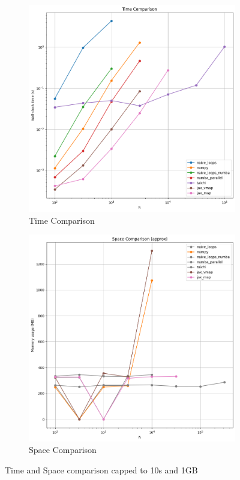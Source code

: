 \documentclass[a4paper, 11pt]{article}         %
\begin{document}
\begin{figure}
\centering
\begin{subfigure}{.5\textwidth}
  \centering
  \includegraphics[width=\linewidth]{images/time_comp2}
  \caption{Time Comparison}
  \label{fig:time}
\end{subfigure}%
\begin{subfigure}{.5\textwidth}
  \centering
  \includegraphics[width=\linewidth]{images/space_comp2}
  \caption{Space Comparison}
  \label{fig:space}
\end{subfigure}
\caption{Time and Space comparison capped to 10s and 1GB}
\label{fig:test}
\end{figure}
\end{document}
